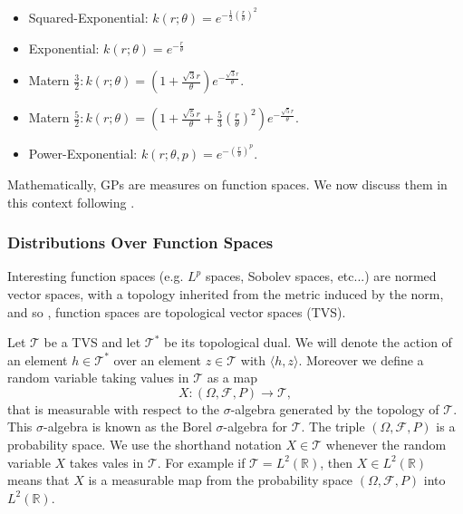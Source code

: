 \documentclass{article}
\newcommand{\tvs}{\mathscr{T}}
\begin{document}
\begin{itemize}
\item Squared-Exponential: $k(r;\theta)=e^{-\frac{1}{2}(\frac{r}{\theta})^{2}}$
\item Exponential: $k(r;\theta)=e^{-\frac{r}{\theta}}$\\
\item Matern $\frac{3}{2}: k(r;\theta)=(1+\frac{\sqrt{3}r}{\theta})e^{-\frac{\sqrt{3}r}{\theta}}$.
\item Matern $\frac{5}{2}: k(r;\theta)=(1+\frac{\sqrt{5}r}{\theta}+\frac{5}{3}
(\frac{r}{\theta})^{2})e^{-\frac{\sqrt{5}r}{\theta}}$.
\item Power-Exponential: $k(r;\theta,p)=e^{-(\frac{r}{\theta})^{p}}$.
\end{itemize}

Mathematically, GPs are measures on function spaces. We now discuss them in this
context following \cite{lifshits2012lectures}.




\subsubsection{Distributions Over Function Spaces}
Interesting function spaces (e.g. $L^{p}$ spaces, Sobolev spaces, etc...) are 
normed vector spaces, with a topology inherited from the metric induced by the norm, and so 
, function spaces are topological vector spaces (TVS). 

Let $\mathscr{T}$ be a TVS and  let $\mathscr{T}^{*}$ be its topological dual. 
We will denote the action of an 
element $h\in\tvs^{*}$ over an element $z\in\tvs$ with $\langle h,z\rangle$. Moreover 
we  define a random variable taking values in $\tvs$ as a map 
\begin{equation*}
X:(\Omega,\mathscr{F},P)\longrightarrow\tvs,
\end{equation*}
that is measurable with respect to the $\sigma$-algebra generated by the topology
of $\tvs$. This $\sigma$-algebra is known as the Borel $\sigma$-algebra for $\tvs$.
The triple $(\Omega,\mathscr{F},P)$ is a probability space. 
We use the shorthand notation  $X\in\tvs$ whenever the random variable $X$ takes vales in $\tvs$. 
For example if $\tvs=L^{2}(\mathbb{R})$,  then  $X\in L^{2}(\mathbb{R})$ means that $X$ is a measurable
map from the probability space $(\Omega,\mathscr{F},P)$ into $L^{2}(\mathbb{R})$.
\end{document}
